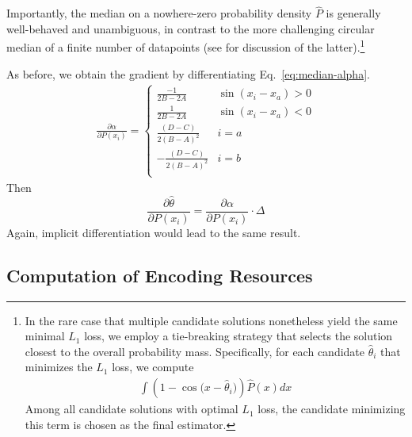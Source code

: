 Importantly, the median on a nowhere-zero probability density $\widehat{P}$ is generally well-behaved and unambiguous, in contrast to the more challenging circular median of a finite number of datapoints (see \citet{otieno2003more} for discussion of the latter).\footnote{In the rare case that multiple candidate solutions nonetheless yield the same minimal $L_1$ loss, we employ a tie-breaking strategy that selects the solution closest to the overall probability mass. Specifically, for each candidate $\widehat{\theta}_i$ that minimizes the $L_1$ loss, we compute
\begin{align*}
    \int (1-\cos\bigl(x - \widehat{\theta}_i\bigr)) \widehat{P}(x)  dx
\end{align*}
Among all candidate solutions with optimal $L_1$ loss, the candidate minimizing this term is chosen as the final estimator.}



As before, we obtain the gradient by differentiating Eq.~\ref{eq:median-alpha}. 
\begin{align*}
    \frac{\partial \alpha}{\partial P(x_i)} = \begin{cases}
        \frac{-1}{2B-2A} & \sin(x_i-x_a) > 0 \\
        \frac{1}{2B-2A} & \sin(x_i-x_a) < 0 \\
      \frac{(D-C)}{2(B-A)^2}  & i=a \\
        -\frac{(D-C)}{2(B-A)^2} & i=b \\
    \end{cases}
\end{align*}
Then
\begin{equation}
    \frac{\partial \widehat{\theta}}{\partial P(x_i)} = \frac{\partial \alpha}{\partial P(x_i)} \cdot \Delta
\end{equation}
Again, implicit differentiation would lead to the same result. 

\subsection{Computation of Encoding Resources}\label{sec:compute-fi}

